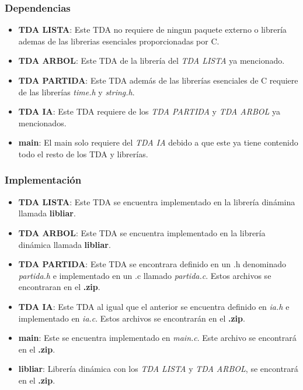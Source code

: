 \documentclass[12pt,twocolum,a4paper]{article}
\begin{document}
\subsubsection{Dependencias}
\begin{itemize}
    \item {\bf TDA LISTA}: Este TDA no requiere de ningun paquete externo o librer\'ia ademas de las librerias esenciales proporcionadas por C.
    \item {\bf TDA ARBOL}: Este TDA de la librer\'ia del {\itshape TDA LISTA} ya mencionado.
    \item {\bf TDA PARTIDA}: Este TDA adem\'as de las librer\'ias esenciales de C requiere de las  librer\'ias {\itshape time.h} y {\itshape string.h}.
    \item {\bf TDA IA}: Este TDA requiere de los {\itshape TDA PARTIDA} y {\itshape TDA ARBOL} ya mencionados.
    \item {\bf main}: El main solo requiere del {\itshape TDA IA} debido a que este ya tiene contenido todo el resto de los TDA y librer\'ias.
\end{itemize}

\subsubsection{Implementaci\'on}
\begin{itemize}
    \item {\bf TDA LISTA}: Este TDA se encuentra implementado en la librer\'ia din\'amina llamada {\bf libliar}.
    \item {\bf TDA ARBOL}: Este TDA se encuentra implementado en la librer\'ia din\'amica llamada {\bf libliar}.
    \item {\bf TDA PARTIDA}: Este TDA se encontrara definido en un .h denominado {\itshape partida.h} e implementado en un .c llamado {\itshape partida.c}. Estos archivos se encontraran en el {\bf .zip}.
    \item {\bf TDA IA}: Este TDA al igual que el anterior se encuentra definido en {\itshape ia.h} e implementado en {\itshape ia.c}. Estos archivos se encontrar\'an en el {\bf .zip}.
    \item {\bf main}: Este se encuentra implementado en {\itshape main.c}. Este archivo se encontrar\'a en el {\bf .zip}.
    \item {\bf libliar}: Librer\'ia din\'amica con los {\itshape TDA LISTA} y {\itshape TDA ARBOL}, se encontrar\'a en el {\bf .zip}.
\end{itemize}
\end{document}
